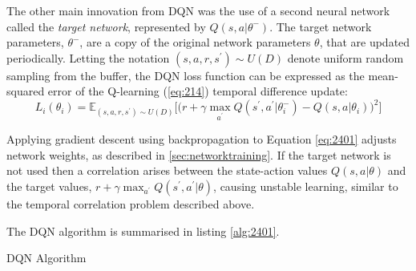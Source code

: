 The other main innovation from DQN was the use of a second neural network called the \textit{target network}, represented by $Q(s,a | \theta^-)$. The target network parameters, $\theta^-$, are a copy of the original network parameters $\theta$, that are updated periodically. Letting the notation $(s,a,r,s^\prime) \sim U(D)$ denote uniform random sampling from the buffer, the DQN loss function can be expressed as the mean-squared error of the Q-learning (\ref{eq:214}) temporal difference update:
\begin{equation}
	L_i(\theta_i) = \mathbb{E}_{(s,a,r,s^\prime) \sim U(D)} \bigg[ \bigg( r + \gamma \max_{a^\prime} Q(s^\prime, a^\prime | \theta_i^-) - Q(s, a | \theta_i) \bigg)^2 \bigg] \label{eq:2401}
\end{equation}

Applying gradient descent using backpropagation to Equation \ref{eq:2401} adjusts network weights, as described in \textsection \ref{sec:networktraining}. If the target network is not used then a correlation arises between the state-action values $Q(s,a | \theta)$ and the target values, $r + \gamma \max_{a^\prime} Q(s^\prime,a^\prime | \theta)$, causing unstable learning, similar to the temporal correlation problem described above.

The DQN algorithm is summarised in listing \ref{alg:2401}.

\begin{algorithm}[h]
	\caption{DQN Algorithm}
	\begin{algorithmic}[1]
			\EndFor
		\EndFor
	\end{algorithmic}\label{alg:2401}
\end{algorithm}

